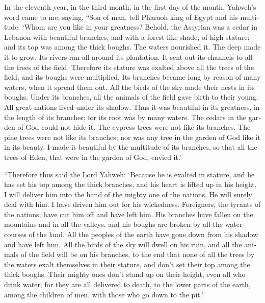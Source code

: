 \begin{paracol}{2}
\begin{otherlanguage}{english}
 In the eleventh year, in the third month, in the first
day of the month, Yahweh's word came to me, saying,  ``Son
of man, tell Pharaoh king of Egypt and his multitude: `Whom are you like
in your greatness?  Behold, the Assyrian was a cedar in
Lebanon with beautiful branches, and with a forest-like shade, of high
stature; and its top was among the thick boughs.  The
waters nourished it. The deep made it to grow. Its rivers ran all around
its plantation. It sent out its channels to all the trees of the field.
 Therefore its stature was exalted above all the trees of
the field; and its boughs were multiplied. Its branches became long by
reason of many waters, when it spread them out.  All the
birds of the sky made their nests in its boughs. Under its branches, all
the animals of the field gave birth to their young. All great nations
lived under its shadow.  Thus it was beautiful in its
greatness, in the length of its branches; for its root was by many
waters.  The cedars in the garden of God could not hide
it. The cypress trees were not like its branches. The pine trees were
not like its branches; nor was any tree in the garden of God like it in
its beauty.  I made it beautiful by the multitude of its
branches, so that all the trees of Eden, that were in the garden of God,
envied it.'

 ``Therefore thus said the Lord Yahweh: `Because he is
exalted in stature, and he has set his top among the thick branches, and
his heart is lifted up in his height,  I will deliver him
into the hand of the mighty one of the nations. He will surely deal with
him. I have driven him out for his wickedness. 
Foreigners, the tyrants of the nations, have cut him off and have left
him. His branches have fallen on the mountains and in all the valleys,
and his boughs are broken by all the watercourses of the land. All the
peoples of the earth have gone down from his shadow and have left him.
 All the birds of the sky will dwell on his ruin, and all
the animals of the field will be on his branches,  to the
end that none of all the trees by the waters exalt themselves in their
stature, and don't set their top among the thick boughs. Their mighty
ones don't stand up on their height, even all who drink water; for they
are all delivered to death, to the lower parts of the earth, among the
children of men, with those who go down to the pit.'


\end{otherlanguage}
\end{paracol}
